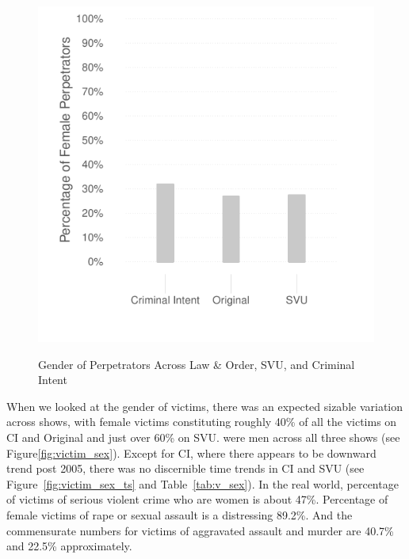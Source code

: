 \documentclass[12pt, letterpaper]{article}
\begin{document}
\begin{figure}[htbp]
\centering
\caption{Gender of Perpetrators Across Law \& Order, SVU, and Criminal Intent}
\includegraphics[scale=1]{../figs/all_criminals_by_gender.pdf}
\label{fig:perp_sex}
\end{figure}

When we looked at the gender of victims, there was an expected sizable variation across shows, with female victims constituting roughly 40\% of all the victims on CI and Original and just over 60\% on SVU. were men across all three shows (see Figure\ref{fig:victim_sex}). Except for CI, where there appears to be downward trend post 2005, there was no discernible time trends in CI and SVU (see Figure~\ref{fig:victim_sex_ts} and Table~\ref{tab:v_sex}). In the real world, percentage of victims of serious violent crime who are women is about 47\%. Percentage of female victims of rape or sexual assault is a distressing 89.2\%. And the commensurate numbers for victims of aggravated assault and murder are 40.7\% and 22.5\% approximately. 
\end{document}
